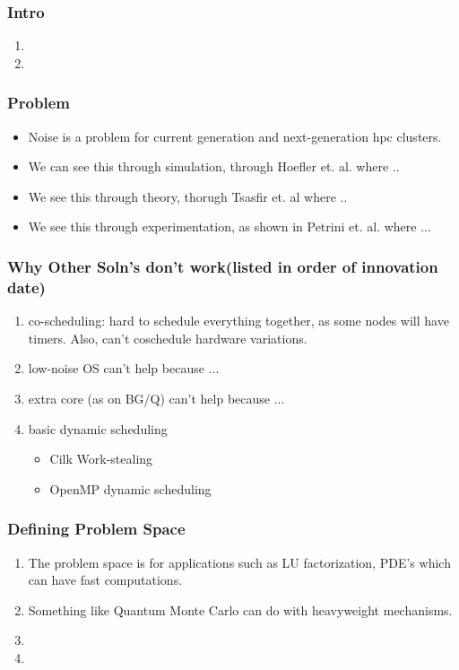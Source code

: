 \begin{frame}
\frametitle{Intro}
\begin{enumerate} 
\item \tiny 
\item \tiny 
\end{enumerate} 
\end{frame}


\begin{frame}
\frametitle{ Problem} 
\begin{itemize}
\item \small Noise is a problem for current generation and next-generation hpc clusters. 
\item \small We can see this through simulation, through Hoefler et. al. where ..
\item \small We see this through theory, thorugh Tsasfir et. al where ..
\item \small We see this through experimentation, as shown in Petrini et. al.  where ...
\end{itemize} 
\end{frame}  

\begin{frame}
\frametitle{Why Other Soln's don't work(listed in order of innovation date) } 
\begin{enumerate} 
\item \small co-scheduling: hard to schedule everything together, as some nodes will have timers. Also, can't coschedule hardware variations. 
\item \small low-noise OS can't help because ...
\item \small extra core (as on BG/Q) can't help because ...
\item \small basic dynamic scheduling
\begin{itemize}
\item \tiny Cilk Work-stealing 
\item \tiny OpenMP dynamic scheduling
\end{itemize}
\end{enumerate} 
\end{frame} 

\begin{frame}
\frametitle{Defining Problem Space} 
\begin{enumerate} 
\item  \small The problem space is for applications such as LU factorization, PDE's which can have fast computations. 
\item \small Something like Quantum Monte Carlo can do with heavyweight mechanisms. 
\item \small 
\item \small 
\end{enumerate} 
\end{frame}


